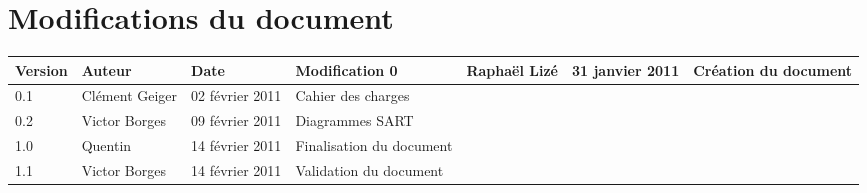 
\section*{Modifications du document}

\begin{center}
\begin{longtable}{|m{14mm}|m{36mm}|m{36mm}|m{60mm}|}
\hline
Version & Auteur & Date & Modification\endhead \hline
0
& %
Raphaël Lizé
& %
31 janvier 2011
& %
Création du document
\\\hline
0.1
& %
Clément Geiger
& %
02 février 2011
& %
Cahier des charges
\\\hline
0.2
& %
Victor Borges
& %
09 février 2011
& %
Diagrammes SART
\\\hline
1.0
& %
Quentin
& %
14 février 2011
& %
Finalisation du document
\\\hline
1.1
& %
Victor Borges
& %
14 février 2011
& %
Validation du document
\\\hline
\end{longtable}
\end{center}

\pagebreak
